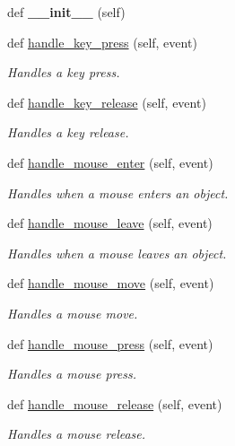 \begin{DoxyCompactItemize}
\item 
\mbox{\label{classcs110graphics__v2_1_1EventHandler_ad00279276ecb947fb9ce6aa7e121e032}} 
def {\bfseries \+\_\+\+\_\+init\+\_\+\+\_\+} (self)
\item 
def \mbox{\hyperlink{classcs110graphics__v2_1_1EventHandler_afd5363f8b0601956f0d6ae320bb43b4a}{handle\+\_\+key\+\_\+press}} (self, event)
\begin{DoxyCompactList}\small\item\em Handles a key press. \end{DoxyCompactList}\item 
def \mbox{\hyperlink{classcs110graphics__v2_1_1EventHandler_a955b2d286040398c47d1bb8c05091cf7}{handle\+\_\+key\+\_\+release}} (self, event)
\begin{DoxyCompactList}\small\item\em Handles a key release. \end{DoxyCompactList}\item 
def \mbox{\hyperlink{classcs110graphics__v2_1_1EventHandler_a642711bb1f5c49ed0f0a1caf05dc14e4}{handle\+\_\+mouse\+\_\+enter}} (self, event)
\begin{DoxyCompactList}\small\item\em Handles when a mouse enters an object. \end{DoxyCompactList}\item 
def \mbox{\hyperlink{classcs110graphics__v2_1_1EventHandler_a1a7544431c591f33313a2432222a2197}{handle\+\_\+mouse\+\_\+leave}} (self, event)
\begin{DoxyCompactList}\small\item\em Handles when a mouse leaves an object. \end{DoxyCompactList}\item 
def \mbox{\hyperlink{classcs110graphics__v2_1_1EventHandler_a33ee3347d8a4d0235ebc1f2e9f900699}{handle\+\_\+mouse\+\_\+move}} (self, event)
\begin{DoxyCompactList}\small\item\em Handles a mouse move. \end{DoxyCompactList}\item 
def \mbox{\hyperlink{classcs110graphics__v2_1_1EventHandler_ab7da753bd26e28aed9bce86968314ae1}{handle\+\_\+mouse\+\_\+press}} (self, event)
\begin{DoxyCompactList}\small\item\em Handles a mouse press. \end{DoxyCompactList}\item 
def \mbox{\hyperlink{classcs110graphics__v2_1_1EventHandler_a78d4d8dfc24ea86540c3ce9cf2b27a24}{handle\+\_\+mouse\+\_\+release}} (self, event)
\begin{DoxyCompactList}\small\item\em Handles a mouse release. \end{DoxyCompactList}\end{DoxyCompactItemize}


